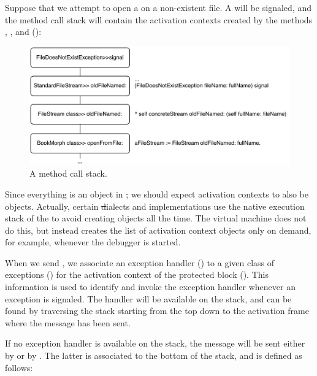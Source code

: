 \documentclass[a4paper,10pt,twoside]{book}
\begin{document}
Suppose that we attempt to open a  on a non-existent file.
A  will be signaled, and the method call stack will contain the activation contexts created by the methods , , and  ():

\begin{figure}[ht]\centering
        \includegraphics[width=.9\linewidth]{Stack}
        \caption{A \pharo method call stack.}
\end{figure}

Since everything is an object in \st, we should expect activation contexts to also be objects.
Actually, certain \st dialects and implementations use the native  execution stack of the  to avoid creating objects all the time.
The \pharo virtual machine does not do this, but instead creates the list of activation context objects only on demand, for example, whenever the debugger is started. 

When we send , we associate an exception handler () to a given class of exceptions () for the activation context of the protected block ().
This information is used to identify and invoke the exception handler whenever an exception is signaled. The handler will be available on the stack, and can be found by traversing the stack starting from the top down to the activation frame where the  message has been sent.

If no exception handler is available on the stack, the message  will be sent either by  or by . The latter is associated to the bottom of the stack, and is defined as follows:
\end{document}
